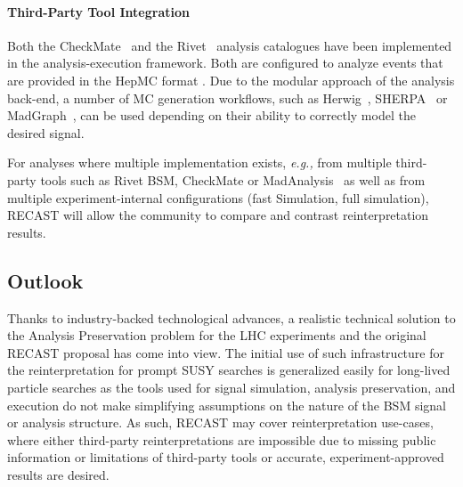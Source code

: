 \paragraph{Third-Party Tool Integration }

Both the CheckMate~\cite{Drees:2013wra,Dercks:2016npn} and the Rivet~\cite{Buckley:2010ar} analysis catalogues have been implemented in the analysis-execution framework. Both are configured to analyze events that are provided in the HepMC format
\cite{Dobbs:2001ck}. Due to the modular approach of the analysis back-end, a number of MC generation workflows, such as Herwig~\cite{Marchesini:1991ch}, SHERPA~\cite{Gleisberg:2008ta} or MadGraph~\cite{Alwall:2011uj}, can be used depending on their ability to correctly model the desired signal.

For analyses where multiple implementation exists, \emph{e.g.,} from multiple third-party tools such as Rivet BSM, CheckMate or MadAnalysis~\cite{Conte:2014zja,Dumont:2014tja} as well as from multiple experiment-internal configurations (fast Simulation, full simulation), RECAST will allow the community to compare and contrast reinterpretation results.

\subsection{Outlook}

Thanks to industry-backed technological advances, a realistic technical solution to the Analysis Preservation problem for the LHC experiments and the original RECAST proposal has come into view. The initial use of such infrastructure for the reinterpretation for prompt SUSY searches is generalized easily for long-lived particle searches as the tools used for  signal simulation, analysis preservation, and execution do not make simplifying assumptions on the nature of the BSM signal or analysis structure.  As such, RECAST may cover reinterpretation use-cases, where either third-party reinterpretations are impossible due to missing public information or limitations of third-party tools or accurate, experiment-approved results are desired.
